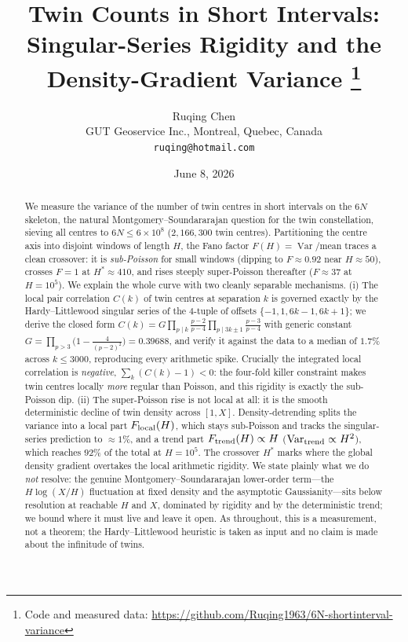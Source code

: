 \documentclass[11pt]{article}
\title{\bf Twin Counts in Short Intervals:\\
Singular-Series Rigidity and the Density-Gradient Variance%
\thanks{Code and measured data: \url{https://github.com/Ruqing1963/6N-shortinterval-variance}}}
\author{Ruqing Chen\\
\small GUT Geoservice Inc., Montreal, Quebec, Canada\\
\small \texttt{ruqing@hotmail.com}}
\date{June 8, 2026}
\theoremstyle{definition}
\newcommand{\Var}{\operatorname{Var}}
\begin{document}
\maketitle

\begin{abstract}
We measure the variance of the number of twin centres in short intervals on the $6N$ skeleton,
the natural Montgomery--Soundararajan question for the twin constellation, sieving all centres to
$6N\le 6\times10^{8}$ ($2{,}166{,}300$ twin centres). Partitioning the centre axis into disjoint
windows of length $H$, the Fano factor $F(H)=\Var/\mathrm{mean}$ traces a clean crossover: it is
\emph{sub-Poisson} for small windows (dipping to $F\approx0.92$ near $H\approx50$), crosses $F=1$ at
$H^{\ast}\approx410$, and rises steeply super-Poisson thereafter ($F\approx37$ at $H=10^{5}$). We
explain the whole curve with two cleanly separable mechanisms. (i) The local pair correlation
$C(k)$ of twin centres at separation $k$ is governed exactly by the Hardy--Littlewood singular series
of the $4$-tuple of offsets $\{-1,1,6k-1,6k+1\}$; we derive the closed form
$C(k)=G\prod_{p\mid k}\frac{p-2}{p-4}\prod_{p\mid 3k\pm1}\frac{p-3}{p-4}$ with generic constant
$G=\prod_{p>3}\bigl(1-\tfrac{4}{(p-2)^2}\bigr)=0.39688$, and verify it against the data to a median of
$1.7\%$ across $k\le3000$, reproducing every arithmetic spike. Crucially the integrated local
correlation is \emph{negative}, $\sum_{k}(C(k)-1)<0$: the four-fold killer constraint makes twin
centres locally \emph{more} regular than Poisson, and this rigidity is exactly the sub-Poisson dip.
(ii) The super-Poisson rise is not local at all: it is the smooth deterministic decline of twin
density across $[1,X]$. Density-detrending splits the variance into a local part $F_{\rm local}(H)$,
which stays sub-Poisson and tracks the singular-series prediction to $\approx1\%$, and a trend part
$F_{\rm trend}(H)\propto H$ ($\Var_{\rm trend}\propto H^{2}$), which reaches $92\%$ of the total at
$H=10^{5}$. The crossover $H^{\ast}$ marks where the global density gradient overtakes the local
arithmetic rigidity. We state plainly what we do \emph{not} resolve: the genuine
Montgomery--Soundararajan lower-order term---the $H\log(X/H)$ fluctuation at fixed density and the
asymptotic Gaussianity---sits below resolution at reachable $H$ and $X$, dominated by rigidity and by
the deterministic trend; we bound where it must live and leave it open. As throughout, this is a
measurement, not a theorem; the Hardy--Littlewood heuristic is taken as input and no claim is made
about the infinitude of twins.
\end{abstract}
\end{document}
